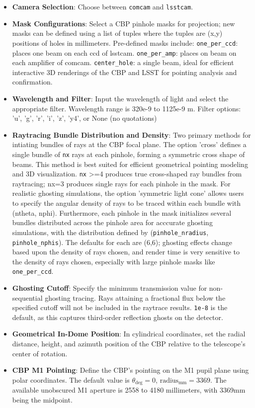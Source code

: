 \documentclass[SE,authoryear,toc]{lsstdoc}
\begin{document}
\begin{itemize}
    \item \textbf{Camera Selection}: Choose between \texttt{comcam} and \texttt{lsstcam}.
    \item \textbf{Mask Configurations}: Select a CBP pinhole masks for projection; new masks can be defined using a list of tuples where the tuples are (x,y) positions of holes in millimeters. Pre-defined masks include: \texttt{one\_per\_ccd}: places one beam on each ccd of lsstcam. \texttt{one\_per\_amp}: places on beam on each amplifier of comcam. \texttt{center\_hole}: a single beam, ideal for efficient interactive 3D renderings of the CBP and LSST for pointing analysis and confirmation.
    
    \item \textbf{Wavelength and Filter}: Input the wavelength of light and select the appropriate filter. Wavelength range is 320e-9 to 1125e-9 m. Filter options: 'u', 'g', 'r', 'i', 'z', 'y4', or None (no quotations)
    
    \item \textbf{Raytracing Bundle Distribution and  Density}: Two primary methods for intiating bundles of rays at the CBP focal plane. The option 'cross' defines a single bundle of \texttt{nx} rays at each pinhole, forming a symmetric cross shape of beams. This method is best suited for efficient geometrical pointing modeling and 3D visualization. \texttt{nx} >=4 produces true cross-shaped ray bundles from raytracing; nx=3 produces single rays for each pinhole in the mask. For realistic ghosting simulations, the option 'symmetric light cone' allows users to specify the angular density of rays to be traced within each bundle with (ntheta, nphi). Furthermore, each pinhole in the mask initializes several bundles distributed across the pinhole area for acccurate ghosting simulations, with the distribution defined by (\texttt{pinhole\_nradius}, \texttt{pinhole\_nphis}). The defaults for each are (6,6); ghosting effects change based upon the density of rays chosen, and render time is very sensitive to the density of rays chosen, especially with large pinhole masks like \texttt{one\_per\_ccd}. 

    \item \textbf{Ghosting Cutoff}: Specify the minimum transmission value for non-sequential ghosting tracing. Rays attaining a fractional flux below the specified cutoff will not be included in the raytrace results. \texttt{1e-8} is the default, as this captures third-order reflection ghosts on the detector.
    \item \textbf{Geometrical In-Dome Position}: In cylindrical coordinates, set the radial distance, height, and azimuth position of the CBP relative to the telescope’s center of rotation.
    \item \textbf{CBP M1 Pointing}: Define the CBP's pointing on the M1 pupil plane using polar coordinates. The default value is $\theta_{\text{deg}}=0$, $\text{radius}_{\text{mm}}=3369$.
The available unobscured M1 aperture is 2558 to 4180 millimeters, with 3369mm being the midpoint.
    
\end{itemize}
\end{document}
